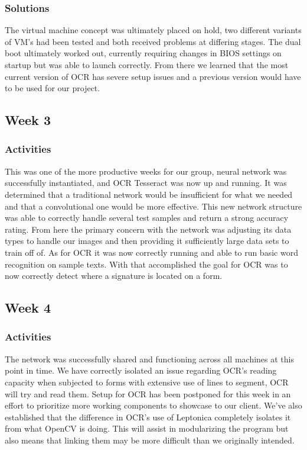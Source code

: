 \documentclass[onecolumn, draftclsnofoot,10pt, compsoc]{IEEEtran}
\begin{document}
\subsubsection{Solutions}
The virtual machine concept was ultimately placed on hold, two different variants of VM’s had been tested and both received problems at differing stages. The dual boot ultimately worked out, currently requiring changes in BIOS settings on startup but was able to launch correctly. From there we learned that the most current version of OCR has severe setup issues and a previous version would have to be used for our project.

\subsection{Week 3}
\subsubsection{Activities}
This was one of the more productive weeks for our group, neural network was successfully instantiated, and OCR Tesseract was now up and running. It was determined that a traditional network would be insufficient for what we needed and that a convolutional one would be more effective. This new network structure was able to correctly handle several test samples and return a strong accuracy rating. From here the primary concern with the network was adjusting its data types to handle our images and then providing it sufficiently large data sets to train off of. As for OCR it was now correctly running and able to run basic word recognition on sample texts. With that accomplished the goal for OCR was to now correctly detect where a signature is located on a form.

\subsection{Week 4}
\subsubsection{Activities}
The network was successfully shared and functioning across all machines at this point in time. We have correctly isolated an issue regarding OCR’s reading capacity when subjected to forms with extensive use of lines to segment, OCR will try and read them. Setup for OCR has been postponed for this week in an effort to prioritize more working components to showcase to our client. We’ve also established that the difference in OCR’s use of Leptonica completely isolates it from what OpenCV is doing. This will assist in modularizing the program but also means that linking them may be more difficult than we originally intended.
\end{document}
